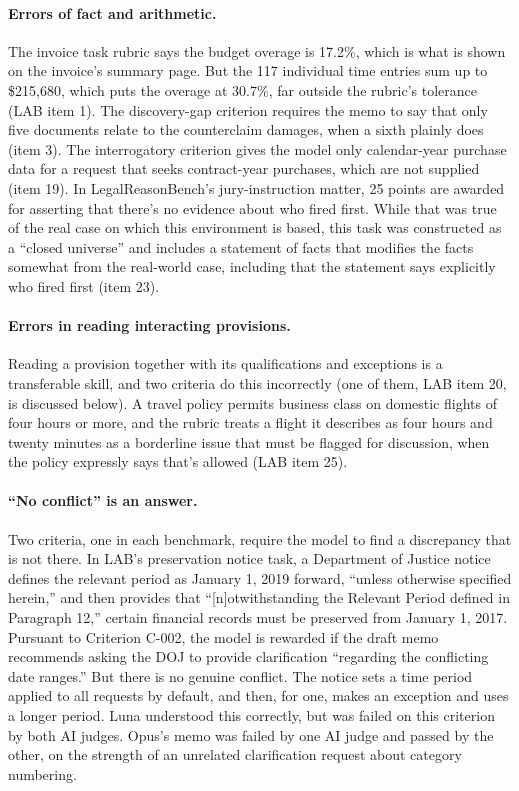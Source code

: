 \documentclass[11pt]{article}
\begin{document}
\paragraph{Errors of fact and arithmetic.} The invoice task rubric says the budget overage is 17.2\%, which is what is shown on the invoice's summary page. But the 117 individual time entries sum up to \$215,680, which puts the overage at 30.7\%, far outside the rubric's tolerance (LAB item 1). The discovery-gap criterion requires the memo to say that only five documents relate to the counterclaim damages, when a sixth plainly does (item 3). The interrogatory criterion gives the model only calendar-year purchase data for a request that seeks contract-year purchases, which are not supplied (item 19). In LegalReasonBench's jury-instruction matter, 25 points are awarded for asserting that there's no evidence about who fired first. While that was true of the real case on which this environment is based, this task was constructed as a ``closed universe'' and includes a statement of facts that modifies the facts somewhat from the real-world case, including that the statement says explicitly who fired first (item 23).

\paragraph{Errors in reading interacting provisions.} Reading a provision together with its qualifications and exceptions is a transferable skill, and two criteria do this incorrectly (one of them, LAB item 20, is discussed below). A travel policy permits business class on domestic flights of four hours or more, and the rubric treats a flight it describes as four hours and twenty minutes as a borderline issue that must be flagged for discussion, when the policy expressly says that's allowed (LAB item 25).

\paragraph{``No conflict'' is an answer.} Two criteria, one in each benchmark, require the model to find a discrepancy that is not there. In LAB's preservation notice task, a Department of Justice notice defines the relevant period as January 1, 2019 forward, ``unless otherwise specified herein,'' and then provides that ``[n]otwithstanding the Relevant Period defined in Paragraph 12,'' certain financial records must be preserved from January 1, 2017. Pursuant to Criterion C-002, the model is rewarded if the draft memo recommends asking the DOJ to provide clarification ``regarding the conflicting date ranges.'' But there is no genuine conflict. The notice sets a time period applied to all requests by default, and then, for one, makes an exception and uses a longer period. Luna understood this correctly, but was failed on this criterion by both AI judges. Opus's memo was failed by one AI judge and passed by the other, on the strength of an unrelated clarification request about category numbering.
\end{document}

